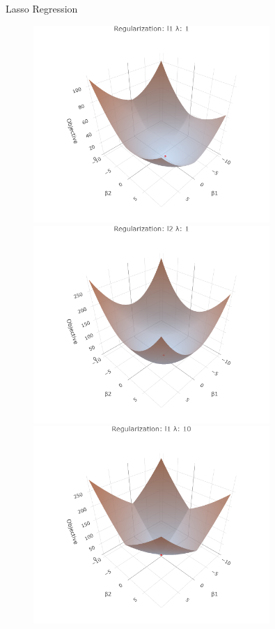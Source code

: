 \documentclass[11pt,compress,t,notes=noshow, xcolor=table]{beamer}
\begin{document}
\begin{vbframe}{Lasso Regression}
\begin{figure}
\begin{minipage}{0.32\linewidth}
        \centerline{\includegraphics[width=0.8\textwidth]{figure/reg_surfaces_l1_lam1.png}}
        \centerline{\includegraphics[width=0.8\textwidth]{figure/reg_surfaces_l2_lam1.png}}
    \end{minipage}
    \begin{minipage}{0.32\linewidth}
        \centerline{\includegraphics[width=0.8\textwidth]{figure/reg_surfaces_l1_lam10.png}}

\end{minipage}
\end{figure}
\end{vbframe}
\end{document}
